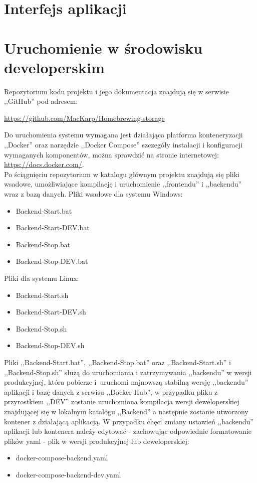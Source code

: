 \documentclass[12pt,a4paper]{article}
\begin{document}
	\section{Interfejs aplikacji}
	\newpage
	
	\section{Uruchomienie w środowisku developerskim}
		\indent Repozytorium kodu projektu i jego dokumentacja znajdują się w serwisie ,,GitHub'' pod adresem: 
			\begin{tcolorbox}[minipage,colback=white,arc=0pt,outer arc=0pt, fontupper=\scriptsize]
				\center
				\url{https://github.com/MacKarp/Homebrewing-storage}
			\end{tcolorbox}
		\indent Do uruchomienia systemu wymagana jest działająca platforma konteneryzacji ,,Docker''
			oraz narzędzie ,,Docker Compose'' szczegóły instalacji i konfiguracji wymaganych
			komponentów, można sprawdzić na stronie internetowej: \url{https://docs.docker.com/}.\\
		\indent Po ściągnięciu repozytorium w katalogu głównym projektu znajdują się pliki wsadowe, umożliwiające kompilację i uruchomienie ,,frontendu'' i ,,backendu''
		wraz z bazą danych.
		Pliki wsadowe dla systemu Windows:
		\begin{itemize}
			\item Backend-Start.bat
			\item Backend-Start-DEV.bat
			\item Backend-Stop.bat
			\item Backend-Stop-DEV.bat
		\end{itemize}
		Pliki dla systemu Linux:
		\begin{itemize}
			\item Backend-Start.sh
			\item Backend-Start-DEV.sh
			\item Backend-Stop.sh
			\item Backend-Stop-DEV.sh
		\end{itemize}
		Pliki ,,Backend-Start.bat'', ,,Backend-Stop.bat'' oraz ,,Backend-Start.sh'' i ,,Backend-Stop.sh'' służą do uruchomiania i zatrzymywania ,,backendu'' w wersji produkcyjnej,
		która pobierze i~uruchomi najnowszą stabilną wersję ,,backendu'' aplikacji i bazę danych z serwisu ,,Docker Hub'', w przypadku pliku z przyrostkiem ,,DEV''
		zostanie uruchomiona kompilacja wersji deweloperskiej znajdującej się w lokalnym katalogu ,,Backend'' a następnie zostanie utworzony kontener z działającą aplikacją.
		W przypadku chęci zmiany ustawień ,,backendu'' aplikacji lub kontenera należy edytować - zachowując odpowiednie formatowanie plików yaml - plik w wersji produkcyjnej
		lub deweloperskiej:
		\begin{itemize}
			\item docker-compose-backend.yaml
			\item docker-compose-backend-dev.yaml		
		\end{itemize}
	\newpage	
	
\end{document}
